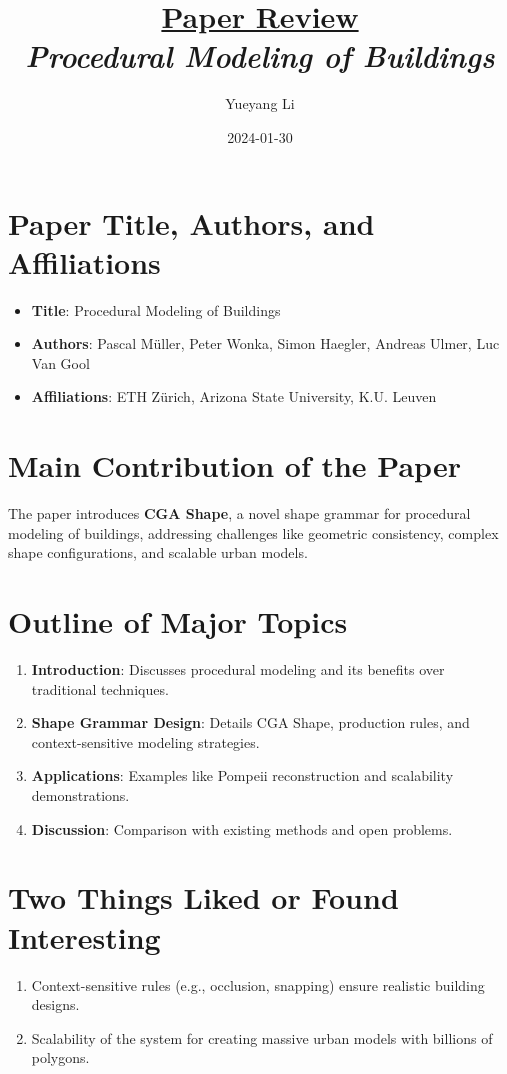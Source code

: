 \documentclass[12pt]{article}
\newcommand{\paperTitle}{
    \textit{\normalsize{Procedural Modeling of Buildings}}  
}
\begin{document}
\title{\Large\uline{\textbf{Paper Review}} \\[0.4em]
\paperTitle{} 
}
\author{Yueyang Li}
\date{2024-01-30}

\maketitle

\section{Paper Title, Authors, and Affiliations}
\begin{itemize}[noitemsep]
    \item \textbf{Title}: Procedural Modeling of Buildings
    \item \textbf{Authors}: Pascal Müller, Peter Wonka, Simon Haegler, Andreas Ulmer, Luc Van Gool
    \item \textbf{Affiliations}: ETH Zürich, Arizona State University, K.U. Leuven
\end{itemize}

\section{Main Contribution of the Paper}
The paper introduces \textbf{CGA Shape}, a novel shape grammar for procedural modeling of buildings, addressing challenges like geometric consistency, complex shape configurations, and scalable urban models.

\section{Outline of Major Topics}
\begin{enumerate}[noitemsep]
    \item \textbf{Introduction}: Discusses procedural modeling and its benefits over traditional techniques.
    \item \textbf{Shape Grammar Design}: Details CGA Shape, production rules, and context-sensitive modeling strategies.
    \item \textbf{Applications}: Examples like Pompeii reconstruction and scalability demonstrations.
    \item \textbf{Discussion}: Comparison with existing methods and open problems.
\end{enumerate}

\section{Two Things Liked or Found Interesting}
\begin{enumerate}[noitemsep]
    \item Context-sensitive rules (e.g., occlusion, snapping) ensure realistic building designs.
    \item Scalability of the system for creating massive urban models with billions of polygons.
\end{enumerate}
\end{document}
